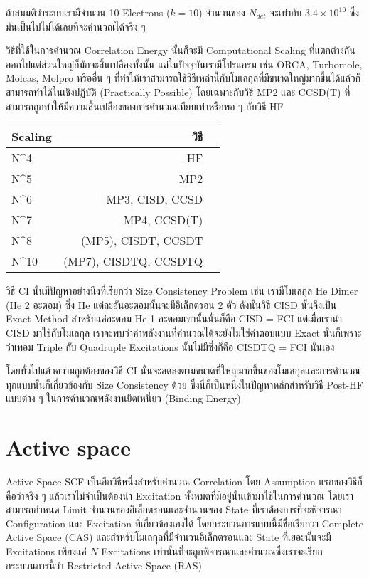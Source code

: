 ถ้าสมมติว่าระบบเรามีจำนวน 10 Electrons ($k = 10$) จำนวนของ $N_{det}$ จะเท่ากับ $3.4 \times 10^{10}$ ซึ่งมันเป็นไปไม่ได้เลยที่จะคำนวณได้จริง ๆ

วิธีที่ใช้ในการคำนวณ Correlation Energy นั้นก็จะมี Computational Scaling ที่แตกต่างกันออกไปแต่ส่วนใหญ่ก็มักจะสิ้นเปลืองทั้งนั้น แต่ในปัจจุบันเรามีโปรแกรม เช่น ORCA, Turbomole, Molcas, Molpro หรืออื่น ๆ ที่ทำให้เราสามารถใช้วิธีเหล่านี้กับโมเลกุลที่มีขนาดใหญ่มากขึ้นได้แล้วก็สามารถทำได้ในเชิงปฏิบัติ (Practically Possible) โดยเฉพาะกับวิธี MP2 และ CCSD(T) ที่สามารถถูกทำให้มีความสิ้นเปลืองของการคำนวณเทียบเท่าหรือพอ ๆ กับวิธี HF

\begin{table}[!htp]
    \Large
    \centering
    \begin{tabular}{lrr}\toprule
        Scaling & วิธี                \\\midrule
        N^4     & HF                    \\
        N^5     & MP2                   \\
        N^6     & MP3, CISD, CCSD       \\
        N^7     & MP4, CCSD(T)          \\
        N^8     & (MP5), CISDT, CCSDT   \\
        N^{10}  & (MP7), CISDTQ, CCSDTQ \\
        \bottomrule
    \end{tabular}
\end{table}

วิธี CI นั้นมีปัญหาอย่างนึงที่เรียกว่า Size Consistency Problem เช่น เรามีโมเลกุล He Dimer (He 2 อะตอม) ซึ่ง He แต่ละอันอะตอมนั้นจะมีอิเล็กตรอน 2 ตัว ดังนั้นวิธี CISD นั้นจึงเป็น Exact Method สำหรับแค่อะตอม He 1 อะตอมเท่านั้นนั่นก็คือ CISD = FCI แต่เมื่อเรานำ CISD มาใช้กับโมเลกุล  เราจะพบว่าค่าพลังงานที่คำนวณได้จะยังไม่ใช่คำตอบแบบ Exact นั่นก็เพราะว่าเทอม Triple กับ Quadruple Excitations นั้นไม่มีซึ่งก็คือ CISDTQ = FCI นั่นเอง

โดยทั่วไปแล้วความถูกต้องของวิธี CI นั้นจะลดลงตามขนาดที่ใหญ่มากขึ้นของโมเลกุลและการคำนวณทุกแบบนั้นก็เกี่ยวข้องกับ Size Consistency ด้วย ซึ่งนี่ก็เป็นหนึ่งในปัญหาหลักสำหรับวิธี Post-HF แบบต่าง ๆ ในการคำนวณพลังงานยึดเหนี่ยว (Binding Energy)

\section{Active space}

Active Space SCF เป็นอีกวิธีหนึ่งสำหรับคำนวณ Correlation โดย Assumption แรกของวิธีก็คือว่าจริง ๆ แล้วเราไม่จำเป็นต้องนำ Excitation ทั้งหมดที่มีอยู่นั้นเข้ามาใช้ในการคำนวณ โดยเราสามารถกำหนด Limit จำนวนของอิเล็กตรอนและจำนวนของ State ที่เราต้องการที่จะพิจารณา Configuration และ Excitation ที่เกี่ยวข้องเองได้ โดยกระบวนการแบบนี้มีชื่อเรียกว่า Complete Active Space (CAS) และสำหรับโมเลกุลที่มีจำนวนอิเล็กตรอนและ State ที่เยอะนั้นจะมี Excitations เพียงแค่ $N$ Excitations เท่านั้นที่จะถูกพิจารณาและคำนวณซึ่งเราจะเรียกกระบวนการนี้ว่า Restricted Active Space (RAS)

